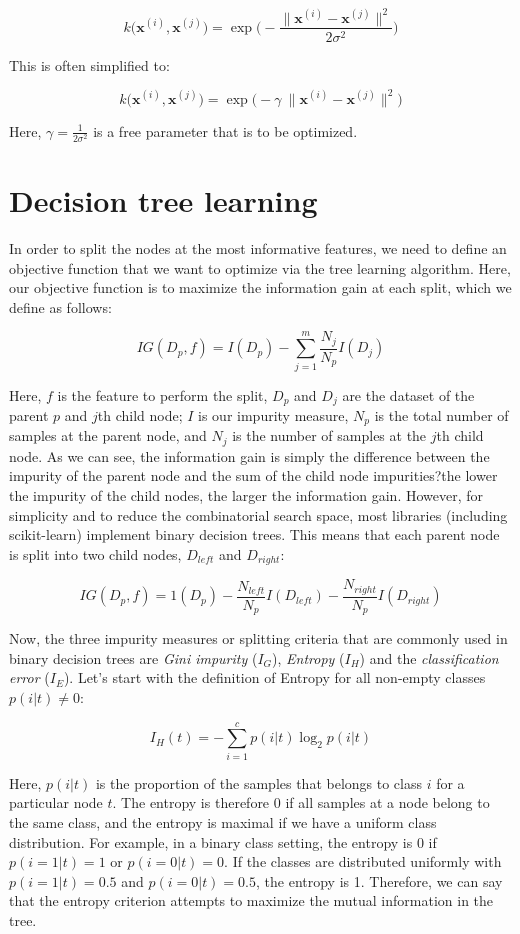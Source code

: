 \documentclass[letterpaper]{report}
\begin{document}
\[
k \big( \mathbf{x}^{(i)}, \mathbf{x}^{(j)}  \big) = \exp \Bigg( - \frac{ \lVert \mathbf{x}^{(i)} - \mathbf{x}^{(j)} \rVert^2  }{2 \sigma^2} \Bigg)
\]

This is often simplified to:

\[
k \big( \mathbf{x}^{(i)}, \mathbf{x}^{(j)}  \big) = \exp \bigg(  -\gamma\ \lVert \mathbf{x}^{(i)} - \mathbf{x}^{(j)} \rVert^2  \bigg)
\]

Here, $\gamma = \frac{1}{2 \sigma^2}$ is a free parameter that is to be optimized.

\section{Decision tree learning}

In order to split the nodes at the most informative features, we need to define an objective function that we want to optimize via the tree learning algorithm. Here, our objective function is to maximize the information gain at each split, which we define as follows:

\[
IG(D_p, f) = I(D_p) - \sum_{j=1}^{m} \frac{N_j}{N_p} I(D_j)
\]

Here, $f$ is the feature to perform the split, $D_p$ and $D_j$ are the dataset of the parent $p$ and $j$th child node; $I$ is our impurity measure, $N_p$ is the total number of samples at the parent node, and $N_j$ is the number of samples at the $j$th child node.  As we can see, the information gain is simply the difference between the impurity of the parent node and the sum of the child node impurities?the lower the impurity of the child nodes, the larger the information gain. However, for simplicity and to reduce the combinatorial search space, most libraries (including scikit-learn) implement binary decision trees. This means that each parent node is split into two child nodes, $D_{left}$ and $D_{right}$:

\[
IG(D_p, f) = 1 (D_p) - \frac{N_{left}}{N_p} I(D_{left}) - \frac{N_{right}}{N_p} I (D_{right})
\]

Now, the three impurity measures or splitting criteria that are commonly used in
binary decision trees are \textit{Gini impurity} ($I_G$), \textit{Entropy} ($I_H$) and the \textit{classification error} ($I_E$). Let's start with the definition of Entropy for all non-empty classes $p(i | t) \neq 0$:


\[
I_H(t) = - \sum_{i=1}^{c} p(i | t) \log_2 p(i|t)
\]

Here, $p(i | t)$ is the proportion of the samples that belongs to class $i$ for a particular node $t$. The entropy is therefore 0 if all samples at a node belong to the same class, and the entropy is maximal if we have a uniform class distribution. For example, in a binary class setting, the entropy is 0 if $p(i=1 | t) = 1$ or $p(i=0| t)=0$. If the classes are distributed uniformly with $p(i=1|t)=0.5$ and $p(i=0|t)=0.5$, the entropy is 1. Therefore, we can say that the entropy criterion attempts to maximize the mutual information in the tree.
\end{document}
